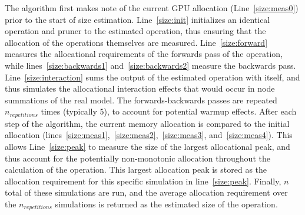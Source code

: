 The algorithm first makes note of the current GPU allocation (Line~\ref{size:meas0}) prior to the start of size estimation.
Line~\ref{size:init} initializes an identical operation and pruner to the estimated operation, thus ensuring that the
allocation of the operations themselves are measured. Line~\ref{size:forward} measures the allocational requirements
of the forwards pass of the operation, while lines~\ref{size:backwards1} and~\ref{size:backwards2}  measure the backwards pass.
Line~\ref{size:interaction} sums
the output of the estimated operation with itself, and thus simulates the allocational interaction effects that
would occur in node summations of the real model. The forwards-backwards passes are repeated $n_{repetitions}$ times (typically 5),
to account for potential warmup effects. After each step of the algorithm, the current memory allocation is
compared to the initial allocation (lines~\ref{size:meas1},~\ref{size:meas2},~\ref{size:meas3}, and~\ref{size:meas4}).
This allows Line~\ref{size:peak} to measure the size of the largest allocational peak, and thus account for the potentially
non-monotonic allocation throughout the calculation of the operation. This largest allocation peak is stored as the
allocation requirement for this specific simulation in line~\ref{size:peak}. Finally, $n$ total of these simulations
are run, and the average allocation requirement over the $n_{repetitions}$ simulations is returned as the estimated size of the operation.

